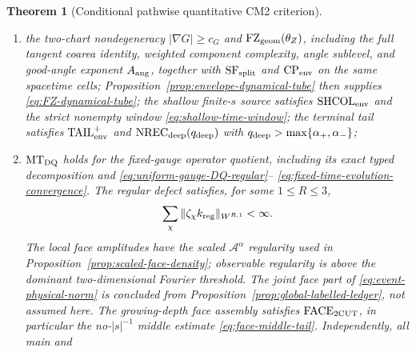 \documentclass[11pt]{article}
\newtheorem{theorem}{Theorem}[section]
\begin{document}
\begin{theorem}[Conditional pathwise quantitative CM2 criterion]
\begin{enumerate}[label=\textup{(H\arabic*)}]
      those same frozen parents.
      The selection-safe joint source likelihood is verified either by the
      same-carrier clause of Lemma~\ref{lem:joint-source-factor-criterion} or
      by its explicit $\mathrm{CARRIER\_MATCH}$ alternative.
      Here \(\mathrm{KRH}_{p_W}\) is uniform on every frozen parent kernel.
      These interfaces and the dominant chart bounds
      \eqref{eq:primitive-dominant-chart-bounds} have the
      parameter-uniform constants required by $\mathrm{UCR}_{\rm sh}$ for
      $C_{\rm mid}(\eta_{\rm hi})N\le L(s)$.  The cutoffs
      \eqref{eq:three-frequency-cutoffs} satisfy
      $0<\eta_{\rm lo}<\eta_{\rm hi}$ and
      $r_{\rm obs}>2+\beta_{\rm phase}^{W}$,
      \eqref{eq:ultra-high-exponent-window}, and the complete phase exponent
      \eqref{eq:complete-phase-exponent}; longer shallow times are not estimated
      by this interface;
\item the two-chart nondegeneracy $|\nabla G|\ge c_G$ and
      $\mathrm{FZ}_{\rm geom}(\theta_Z)$, including the full tangent coarea identity,
      weighted component complexity, angle sublevel, and good-angle exponent
      $A_{\rm ang}$, together with $\mathrm{SF}_{\rm split}$ and
      $\mathrm{CP}_{\rm env}$ on the same spacetime cells;
      Proposition~\ref{prop:envelope-dynamical-tube}
      then supplies \eqref{eq:FZ-dynamical-tube}; the shallow finite-$s$
      source satisfies $\mathrm{SHCOL}_{\rm env}$ and the strict nonempty
      window \eqref{eq:shallow-time-window}; the terminal tail satisfies
      $\mathrm{TAIL}_{\rm env}^{+}$ and
      $\mathrm{NREC}_{\rm deep}(q_{\rm deep})$ with
      $q_{\rm deep}>\max\{\alpha_+,\alpha_-\}$;
\item $\mathrm{MT}_{\rm DQ}$ holds for the fixed-gauge operator quotient,
      including its exact typed decomposition and
      \eqref{eq:uniform-gauge-DQ-regular}--
      \eqref{eq:fixed-time-evolution-convergence}.  The regular defect
      satisfies, for some
      $1\le R\le3$,
      \[
       \sum_\chi\|\zeta_\chi k_{\rm reg}\|_{W^{R,1}}<\infty.
      \]
      The local face amplitudes have the scaled
      $\mathcal A^\alpha$ regularity used in
      Proposition~\ref{prop:scaled-face-density}; observable regularity is
      above the dominant two-dimensional Fourier threshold.  The joint face
      part of \eqref{eq:event-physical-norm} is concluded from
      Proposition~\ref{prop:global-labelled-ledger}, not assumed here.
      The growing-depth face assembly satisfies
      $\mathrm{FACE}_{\rm 2CUT}$, in particular the no-$|s|^{-1}$ middle
      estimate \eqref{eq:face-middle-tail}.  Independently, all main and

\end{enumerate}
\end{theorem}
\end{document}

